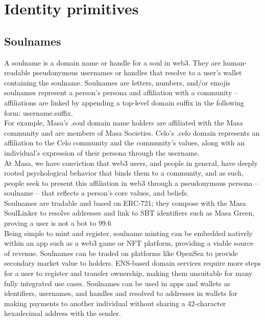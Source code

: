 \documentclass{article}
\begin{document}
\section{Identity primitives }

\subsection{Soulnames}
A soulname is a domain name or handle for a soul in web3. They are human-readable pseudonymous usernames or handles that resolve to a user’s wallet containing the soulname. Soulnames are letters, numbers, and/or emojis soulnames represent a person's persona and affiliation with a community – affiliations are linked by appending a top-level domain suffix in the following form: username.suffix. 
\\
\newline
For example, Masa’s .soul domain name holders are affiliated with the Masa community and are members of Masa Societies. Celo’s .celo domain represents an affiliation to the Celo community and the community's values, along with an individual's expression of their persona through the username. 
\\
\newline
At Masa, we have conviction that web3 users, and people in general, have deeply rooted psychological behavior that binds them to a community, and as such, people seek to present this affiliation in web3 through a pseudonymous persona – soulname – that reflects a person's core values, and beliefs. 
\\
\newline
Soulnames are tradable and based on ERC-721; they compose with the Masa SoulLinker to resolve addresses and link to SBT identifiers such as Masa Green, proving a user is not a bot to 99.6%
\\
\newline
Being simple to mint and register, soulname minting can be embedded natively within an app such as a web3 game or NFT platform, providing a viable source of revenue. Soulnames can be traded on platforms like OpenSea to provide secondary market value to holders. ENS-based domain services require more steps for a user to register and transfer ownership, making them unsuitable for many fully integrated use cases. Soulnames can be used in apps and wallets as identifiers, usernames, and handles and resolved to addresses in wallets for making payments to another individual without sharing a 42-character hexadecimal address with the sender.  
\end{document}
